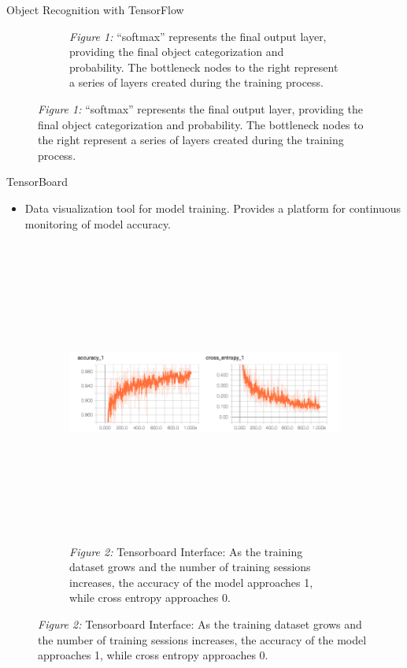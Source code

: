 \documentclass[22pt]{beamer}
\begin{document}
\begin{frame}[fragile]
\begin{textblock}{7.25}
\begin{block}{Object Recognition with TensorFlow}
\begin{figure}[htbp]
\begin{subfigure}{0.95\textwidth}
   \caption*{\textit{Figure 1:} “softmax” represents the final output layer, providing the final object categorization and probability. The bottleneck nodes to the right represent a series of layers created during the training process.}
   \label{fig:softmax}
\end{subfigure}
\end{figure}
TensorBoard
\begin{itemize}
\item Data visualization tool for model training. Provides a platform for continuous monitoring of model accuracy. 
\end{itemize}
\begin{figure}[htbp] %
\begin{subfigure}{0.95\textwidth}
   \centering
   \includegraphics[height=10cm]{interface.png}
   \caption*{\textit{Figure 2:} Tensorboard Interface:  As the training dataset grows and the number of training sessions increases, the accuracy of the model approaches 1, while cross entropy approaches 0.}
   \label{fig:interface}
\end{subfigure}
\end{figure}
\end{block}
\end{textblock}


\end{frame}
\end{document}

